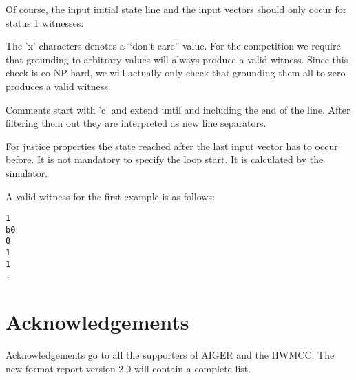 \documentclass{llncs}
\begin{document}
Of course, the input initial state line and the input vectors should
only occur for status 1 witnesses.

The 'x' characters denotes a ``don't care'' value.  For the competition
we require that grounding to arbitrary values  will
always produce a valid witness.  Since this check is co-NP hard, we
will actually only check that grounding them all to zero produces
a valid witness.

Comments start with 'c' and extend until and including the end of the line.
After filtering them out they are interpreted as new line separators.

For justice properties the state reached after the last input vector
has to occur before.  It is not mandatory to specify the
loop start.  It is calculated by the simulator.

A valid witness for the first example is as follows:
{\small
\begin{verbatim}
1
b0
0
1
1
.
\end{verbatim}}

\section{Acknowledgements}

Acknowledgements go to all the supporters of AIGER and the HWMCC.
The new format report version 2.0 will contain a complete list.
\end{document}
